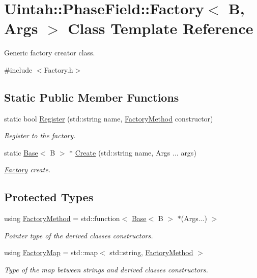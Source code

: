 \hypertarget{classUintah_1_1PhaseField_1_1Factory}{}\section{Uintah\+:\+:Phase\+Field\+:\+:Factory$<$ B, Args $>$ Class Template Reference}
\label{classUintah_1_1PhaseField_1_1Factory}


Generic factory creator class.  




{\ttfamily \#include $<$Factory.\+h$>$}

\subsection*{Static Public Member Functions}
\begin{DoxyCompactItemize}
\item 
static bool \hyperlink{classUintah_1_1PhaseField_1_1Factory_a52c2dbc3f693413bbd5d1338fa01e3bf}{Register} (std\+::string name, \hyperlink{classUintah_1_1PhaseField_1_1Factory_a896fba2efac0d82ed579b9b0772936f9}{Factory\+Method} constructor)
\begin{DoxyCompactList}\small\item\em Register to the factory. \end{DoxyCompactList}\item 
static \hyperlink{classUintah_1_1PhaseField_1_1Base}{Base}$<$ B $>$ $\ast$ \hyperlink{classUintah_1_1PhaseField_1_1Factory_a286182b5e21838a37893f80613d4a449}{Create} (std\+::string name, Args ... args)
\begin{DoxyCompactList}\small\item\em \hyperlink{classUintah_1_1PhaseField_1_1Factory}{Factory} create. \end{DoxyCompactList}\end{DoxyCompactItemize}
\subsection*{Protected Types}
\begin{DoxyCompactItemize}
\item 
using \hyperlink{classUintah_1_1PhaseField_1_1Factory_a896fba2efac0d82ed579b9b0772936f9}{Factory\+Method} = std\+::function$<$ \hyperlink{classUintah_1_1PhaseField_1_1Base}{Base}$<$ B $>$ $\ast$(Args...) $>$
\begin{DoxyCompactList}\small\item\em Pointer type of the derived classes constructors. \end{DoxyCompactList}\item 
using \hyperlink{classUintah_1_1PhaseField_1_1Factory_aedb6067c58282efa01a12ad72414e0ac}{Factory\+Map} = std\+::map$<$ std\+::string, \hyperlink{classUintah_1_1PhaseField_1_1Factory_a896fba2efac0d82ed579b9b0772936f9}{Factory\+Method} $>$
\begin{DoxyCompactList}\small\item\em Type of the map between strings and derived classes constructors. \end{DoxyCompactList}\end{DoxyCompactItemize}
